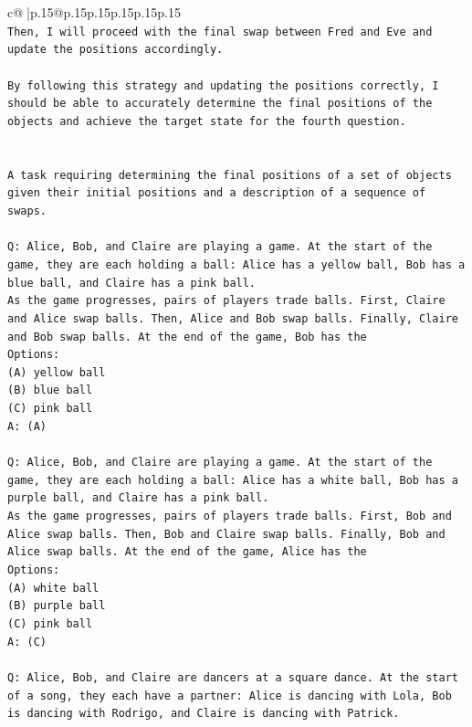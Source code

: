 \documentclass{article}
\begin{document}
{\begin{supertabular}{c@{$\;$}|p{.15\linewidth}@{}p{.15\linewidth}p{.15\linewidth}p{.15\linewidth}p{.15\linewidth}p{.15\linewidth}}
{{{\\ 
\texttt{Then, I will proceed with the final swap between Fred and Eve and update the positions accordingly.} \\
\\ 
\texttt{By following this strategy and updating the positions correctly, I should be able to accurately determine the final positions of the objects and achieve the target state for the fourth question.} \\
\\ 
\\ 
\texttt{A task requiring determining the final positions of a set of objects given their initial positions and a description of a sequence of swaps.} \\
\\ 
\texttt{Q: Alice, Bob, and Claire are playing a game. At the start of the game, they are each holding a ball: Alice has a yellow ball, Bob has a blue ball, and Claire has a pink ball.} \\
\texttt{As the game progresses, pairs of players trade balls. First, Claire and Alice swap balls. Then, Alice and Bob swap balls. Finally, Claire and Bob swap balls. At the end of the game, Bob has the} \\
\texttt{Options:} \\
\texttt{(A) yellow ball} \\
\texttt{(B) blue ball} \\
\texttt{(C) pink ball} \\
\texttt{A: (A)} \\
\\ 
\texttt{Q: Alice, Bob, and Claire are playing a game. At the start of the game, they are each holding a ball: Alice has a white ball, Bob has a purple ball, and Claire has a pink ball.} \\
\texttt{As the game progresses, pairs of players trade balls. First, Bob and Alice swap balls. Then, Bob and Claire swap balls. Finally, Bob and Alice swap balls. At the end of the game, Alice has the} \\
\texttt{Options:} \\
\texttt{(A) white ball} \\
\texttt{(B) purple ball} \\
\texttt{(C) pink ball} \\
\texttt{A: (C)} \\
\\ 
\texttt{Q: Alice, Bob, and Claire are dancers at a square dance. At the start of a song, they each have a partner: Alice is dancing with Lola, Bob is dancing with Rodrigo, and Claire is dancing with Patrick.} \\
}}}
\end{supertabular}}
\end{document}
